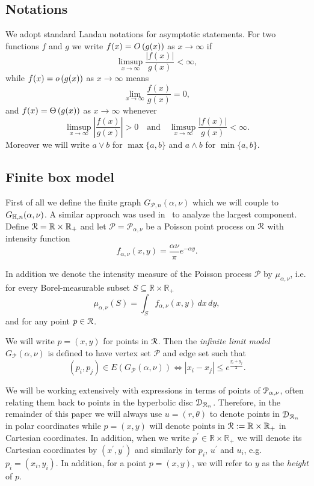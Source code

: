 \subsection{Notations}
We adopt standard Landau notations for asymptotic statements. For two functions $f$ and $g$ we write $f(x) = O\left(g(x)\right)$ as $x \to \infty$ if
\[
	\limsup_{x \to \infty} \frac{|f(x)|}{g(x)} < \infty,
\]
while $f(x) = o\left(g(x)\right)$ as $x \to \infty$ means
\[
	\lim_{x \to \infty} \frac{f(x)}{g(x)} = 0,
\]
and $f(x) = \Theta\left(g(x)\right)$ as $x \to \infty$ whenever
\[
	\limsup_{x \to \infty} \left|\frac{f(x)}{g(x)}\right| > 0 \quad \text{and} \quad
	\limsup_{x \to \infty} \frac{|f(x)|}{g(x)} < \infty.
\]
Moreover we will write $a \vee b$ for $\max\{a,b\}$ and $a \wedge b$ for $\min\{a,b\}$.

\subsection{Finite box model}\label{ssec:finite_model}

First of all we define the finite graph $G_{\mathcal{P},n}(\alpha, \nu)$ which we will couple to $G_{\mathbb{H}, n}(\alpha, \nu)$. A similar approach was used in~\cite{fountoulakis2018law} to analyze the largest component. Define ${\mathcal R} = \mathbb{R} \times \mathbb{R}_+$ and let $\mathcal{P}=\mathcal{P}_{\alpha,\nu}$ be a Poisson point process on ${\mathcal R}$ with intensity function
\begin{equation}\label{eq:def_intensity_function_f}
	f_{\alpha,\nu}(x,y) = \frac{\alpha \nu}{\pi} e^{-\alpha y}.
\end{equation} 

In addition we denote the intensity measure of the Poisson process $\mathcal{P}$ by $\mu_{\alpha, \nu}$, i.e. for every Borel-measurable subset $S \subseteq \mathbb{R} \times \mathbb{R}_+$
\begin{equation}\label{eq:def_mu_P}
	\mu_{\alpha,\nu}(S) = \int_S f_{\alpha,\nu}(x,y) \, dx \, dy,
\end{equation}
and for any point $p \in {\mathcal R}$.

We will write $p = (x, y)$ for points in ${\mathcal R}$. Then the \emph{infinite limit model} $G_{\mathcal{P}}(\alpha, \nu)$ is defined to have vertex set $\mathcal{P}$ and edge set such that
\[
	(p_i, p_j) \in E(G_{\mathcal{P}}(\alpha, \nu)) \iff |x_i - x_j| \leq e^{\frac{y_i + y_j}{2}}.
\]

\begin{remark}\label{rmk:point_notation}
We will be working extensively with expressions in terms of points of ${\mathcal P}_{\alpha, \nu}$, often relating them back to points in the hyperbolic disc ${\mathcal D}_{{\mathcal R}_n}$. Therefore, in the remainder of this paper we will always use $u = (r,\theta)$ to denote points in ${\mathcal D}_{{\mathcal R}_n}$ in polar coordinates while $p = (x,y)$ will denote points in ${\mathcal R} := \mathbb{R} \times \mathbb{R}_+$ in Cartesian coordinates. In addition, when we write $p^\prime \in \mathbb{R} \times \mathbb{R}_+$ we will denote its Cartesian coordinates by $(x^\prime, y^\prime)$ and similarly for $p_i$, $u^\prime$ and $u_i$, e.g. $p_i = (x_i, y_i)$. In addition, for a point $p = (x,y)$, we will refer to $y$ as the \emph{height} of $p$.
\end{remark}

